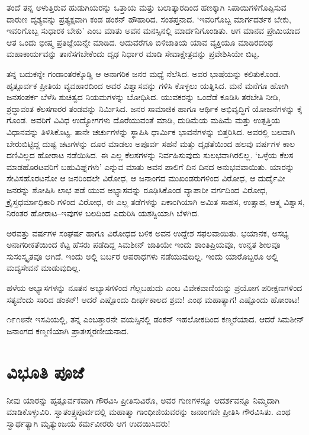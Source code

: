 ತಂದೆ ತನ್ನ ಅಳುತ್ತಿರುವ ಹುಡುಗಿಯರನ್ನು ಒತ್ತಾಯ ಮತ್ತು ಬಲಾತ್ಕಾರದಿಂದ ಹಣಕ್ಕಾಗಿ ಸಿಪಾಯಿಗಳಿಗೊಪ್ಪಿಸುವ ದಾರುಣ ದೃಶ್ಯವನ್ನು ಪ್ರತ್ಯಕ್ಷವಾಗಿ ಕಂಡ ಡಂಕನ್ ಹೌಹಾರಿದ. ಸಂತಪ್ತನಾದ. ‘ಇವರಿಗೊಬ್ಬ ಮಾರ್ಗದರ್ಶಕ ಬೇಕು, ಇವರಿಗೊಬ್ಬ ಸುಧಾರಕ ಬೇಕು’ ಎಂಬ ಮಾತು ಅವನ ಮನಸ್ಸಿನಲ್ಲಿ ಮಾರ್ದನಿಗೊಂಡಿತು. ಆಗ ಮಾನವ ಪ್ರೇಮಿಯಾದ ಆತ ಒಂದು ಭೀಷ್ಮ ಪ್ರತಿಜ್ಞೆಯನ್ನೇ ಮಾಡಿದ. ಅದುವರೆಗೂ ಬಿಳಿಜಾತಿಯ ಯಾವ ವ್ಯಕ್ತಿಯೂ ಮಾಡಿರದಂಥ ಮಹಾಕಾರ್ಯವನ್ನು ತಾನೆಸಗಬೇಕೆಂದು ದೃಢ ನಿರ್ಧಾರ ಮಾಡಿ ಸೇವಾಕ್ಷೇತ್ರವನ್ನು ಪ್ರವೇಶಿಸಿಯೇ ಬಿಟ್ಟ.

ತನ್ನ ಬದುಕನ್ನೇ ಗಂಡಾಂತರಕ್ಕೊಡ್ಡಿ ಆ ಅನಾಗರಿಕ ಜನರ ಮಧ್ಯೆ ನೆಲೆಸಿದ. ಅವರ ಭಾಷೆಯನ್ನು ಕಲಿತುಕೊಂಡ. ಹೃತ್ಪೂರ್ವಕ ಪ್ರೀತಿಯ ವ್ಯವಹಾರದಿಂದ ಅವರ ವಿಶ್ವಾಸವನ್ನು ಗಳಿಸಿ ಕೊಳ್ಳಲು ಯತ್ನಿಸಿದ. ಮನೆ ಮನೆಗೂ ಹೋಗಿ ಜನಸಂಪರ್ಕ ಬೆಳೆಸಿ ಶುಚಿತ್ವದ ನಿಯಮಗಳನ್ನು ಬೋಧಿಸಿದ. ಯುವಕರನ್ನು ಒಂದೆಡೆ ಕೂಡಿಸಿ ತರಬೇತಿ ನೀಡಿ, ಶ್ರದ್ಧಾವಂತ ಕೆಲಸಗಾರರ ತಂಡವನ್ನು ನಿರ್ಮಿಸಿದ. ಜನರ ಸಾಮಾಜಿಕ ಹಾಗೂ ಆರ್ಥಿಕ ಅಭಿವೃದ್ಧಿಗೆ ಯೋಜನೆಗಳನ್ನು ಕೈ ಗೊಂಡ. ಅವರಿಗೆ ವಿವಿಧ ಉದ್ಯೋಗಗಳು ದೊರೆಯುವಂತೆ ಮಾಡಿ, ದುಡಿಮೆಯ ಮಹಿಮೆ ಮತ್ತು ಉತ್ಪತ್ತಿಯ ವಿಧಾನವನ್ನು ತಿಳಿಸಿಕೊಟ್ಟ. ತಾನೇ ಚರ್ಚುಗಳನ್ನು ಸ್ಥಾಪಿಸಿ ಧಾರ್ಮಿಕ ಭಾವನೆಗಳನ್ನು ಬಿತ್ತರಿಸಿದ. ಅವರಲ್ಲಿ ಬಲವಾಗಿ ಬೇರುಬಿಟ್ಟಿದ್ದ ದುಷ್ಟ ಚಟಗಳನ್ನು ದೂರ ಮಾಡಲು ಅಪೂರ್ವ ಸಹನೆ ಮತ್ತು ದೃಢತೆಯಿಂದ ಹಲವು ವರ್ಷಗಳ ಕಾಲ ದಣಿವಿಲ್ಲದ ಹೋರಾಟ ನಡೆಯಿಸಿದ. ಈ ಎಲ್ಲ ಕೆಲಸಗಳನ್ನು ನಿರ್ವಹಿಸುವುದು ಸುಲಭವಾಗಿರಲಿಲ್ಲ. ‘ಒಳ್ಳೆಯ ಕೆಲಸ ಮಾಡಹೊರಟವರಿಗೆ ಬಹುವಿಘ್ನಗಳು’ ಎನ್ನುವ ಮಾತು ಅವನ ಪಾಲಿಗೆ ದಿನ ದಿನದ ಅನುಭವವಾಯಿತು. ಯಾರನ್ನು ಸೇವಿಸಹೊರಟನೋ ಆ ಜನರಿಂದಲೇ ವಿರೋಧ, ಆ ಜನಾಂಗದ ಮುಖಂಡರುಗಳಿಂದ ವಿರೋಧ, ಆ ದುರ್ದೈವೀ ಜನರನ್ನು ಶೋಷಿಸಿ ಲಾಭ ಪಡೆ ಯುವ ಅಭ್ಯಾಸವನ್ನು ರೂಢಿಸಿಕೊಂಡ ವ್ಯಾಪಾರೀ ವರ್ಗದಿಂದ ವಿರೋಧ, ಕ್ರೈಸ್ತಧರ್ಮಾಧಿಕಾರಿ ಗಳಿಂದ ವಿರೋಧ, ಈ ಎಲ್ಲ ತಡೆಗಳನ್ನು ಏಕಾಂಗಿಯಾಗಿ ಅಮಿತ ಸಾಹಸ, ಉತ್ಸಾಹ, ಆತ್ಮ ವಿಶ್ವಾಸ, ನಿರಂತರ ಹೋರಾಟ–ಇವುಗಳ ಬಲದಿಂದ ಎದುರಿಸಿ ಯಶಸ್ವಿಯಾಗಿ ಬೆಳಗಿದ.

ಅರವತ್ತು ವರ್ಷಗಳ ಸಂಘರ್ಷ ಹಾಗೂ ವಿರೋಧದ ಬಳಿಕ ಅವನ ಉದ್ದೇಶ ಸಫಲ\-ವಾಯಿತು. ಭಯಾನಕ, ಅಸಭ್ಯ ಅನಾಗರೀಕತೆಯಿಂದ ಕೆಟ್ಟ ಹೆಸರು ಪಡೆದಿದ್ದ ಸಿಮಶೀನ್ ಜಾತಿಯೇ ಇಂದು ಶಾಂತಿಪ್ರಿಯವೂ, ಉನ್ನತ ಶೀಲವೂ ಸುಸಂಸ್ಕೃತವೂ ಆಗಿದೆ. ಇಂದು ಅಲ್ಲಿ ಬರ್ಬರ ಅಪರಾಧಗಳು ನಡೆಯುವುದಿಲ್ಲ. ಇಂದು ಯಾರೊಬ್ಬರೂ ಅಲ್ಲಿ ಮದ್ಯಸೇವನೆ ಮಾಡುವುದಿಲ್ಲ.

ಹಳೆಯ ಅಭ್ಯಾಸಗಳನ್ನು ನೂತನ ಅಭ್ಯಾಸಗಳಿಂದ ಗೆಲ್ಲಬಹುದು ಎಂಬ ವಿವೇಕವಾಣಿಯನ್ನು ಪ್ರಯೋಗ ಪರೀಕ್ಷಣಗಳಿಂದ ಸತ್ಯವೆಂದು ಸಾರಿದ ಡಂಕನ್​! ಆದರೆ ಎಷ್ಟೊಂದು ದೀರ್ಘಕಾಲದ ಶ್ರಮ! ಎಂಥ ಮಹಾತ್ಯಾಗ! ಎಷ್ಟೊಂದು ಹೋರಾಟ!

೧೯೧೮ನೇ ಇಸವಿಯಲ್ಲಿ, ತನ್ನ ಎಂಬತ್ತಾರನೇ ವಯಸ್ಸಿನಲ್ಲಿ ಡಂಕನ್ ಇಹಲೋಕದಿಂದ ಕಣ್ಮರೆಯಾದ. ಆದರೆ ಸಿಮಶೀನ್ ಜನಾಂಗದ ಕಣ್ಮಣಿಯಾಗಿ ಪ್ರಾತಃಸ್ಮರಣೀಯನಾದ.


\section*{ವಿಭೂತಿ ಪೂಜೆ}


ನೀವು ಯಾರನ್ನು ಹೃತ್ಪೂರ್ವಕವಾಗಿ ಗೌರವಿಸಿ ಪ್ರೀತಿಸುವಿರೊ, ಅವರ ಗುಣಗಳನ್ನೂ ಆದರ್ಶವನ್ನೂ ನಿಮ್ಮದಾಗಿ ಮಾಡಿಕೊಳ್ಳುವಿರಿ. ಸ್ವಾತಂತ್ರ್ಯಪೂರ್ವದಲ್ಲಿ ಮಹಾತ್ಮಾ ಗಾಂಧೀಜಿಯವರನ್ನು ಜನಾಂಗವೇ ಪ್ರೀತಿಸಿ ಗೌರವಿಸಿತು. ಎಂಥ ಸ್ವಾರ್ಥತ್ಯಾಗಿ ಮೃತ್ಯುಂಜಯ ಕರ್ಮವೀರರು ಆಗ ಉದಯಿಸಿದರು!

